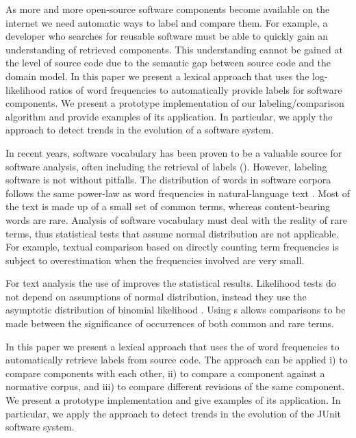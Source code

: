 \documentclass[10pt]{book}
\begin{document}
\asteriskasteriskasterisk


As more and more open-source software components become available on the internet we need automatic ways to label and compare them. For example, a developer who searches for reusable software must be able to quickly gain an understanding of retrieved components. This understanding cannot be gained at the level of source code due to the semantic gap between source code and the domain model. In this paper we present a lexical approach that uses the log-likelihood ratios of word frequencies to automatically provide labels for software components. We present a prototype implementation of our labeling/comparison algorithm and provide examples of its application. In particular, we apply the approach to detect trends in the evolution of a software system.

In recent years, software vocabulary has been proven to be a valuable source for software analysis, often including the retrieval of labels (\eg \cite{Baldi08OOPSLA,EinarHoest,Kuhn07a}). However, labeling software is not without pitfalls. The distribution of words in software corpora follows the same power-law as word frequencies in natural-language text \cite{Linstead09SUITE}. Most of the text is made up of a small set of common terms, whereas content-bearing words are rare. Analysis of software vocabulary must deal with the reality of rare terms, thus statistical tests that assume normal distribution are not applicable. For example, textual comparison based on directly counting term frequencies is subject to overestimation when the frequencies involved are very small.  

For text analysis the use of \loglr improves the statistical results. Likelihood tests do not depend on assumptions of normal distribution, instead they use the asymptotic distribution of binomial likelihood \cite{Dunning}. Using \loglr{}s allows comparisons to be made between the significance of occurrences of both common and rare terms.

In this paper we present a lexical approach that uses the \loglr of word frequencies to automatically retrieve labels from source code. The approach can be applied i) to compare components with each other, ii) to compare a component against a normative corpus, and iii) to compare different revisions of the same component. We present a prototype implementation and give examples of its application. In particular, we apply the approach to detect trends in the evolution of the JUnit software system.
\end{document}
